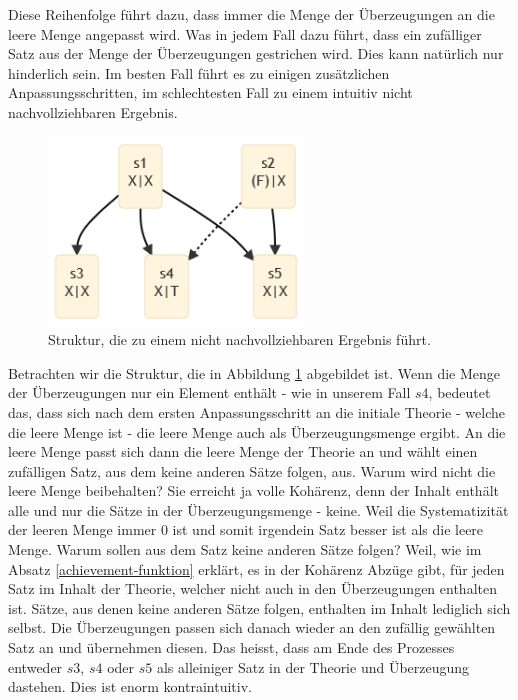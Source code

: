 \documentclass{article}
\begin{document}
Diese Reihenfolge führt dazu, dass immer die Menge der Überzeugungen an die leere Menge angepasst wird. Was in jedem Fall dazu führt, dass ein zufälliger Satz aus der Menge der Überzeugungen gestrichen wird. Dies kann natürlich nur hinderlich sein. Im besten Fall führt es zu einigen zusätzlichen Anpassungsschritten, im schlechtesten Fall zu einem intuitiv nicht nachvollziehbaren Ergebnis.

\begin{figure}[ht]
  \centering
  \includegraphics[width=\textwidth,height=5cm,keepaspectratio]{images/wierd.png}
  \caption{Struktur, die zu einem nicht nachvollziehbaren Ergebnis führt.\label{fig:wierd}}
\end{figure}

Betrachten wir die Struktur, die in Abbildung \ref{fig:wierd} abgebildet ist. Wenn die Menge der Überzeugungen nur ein Element enthält - wie in unserem Fall $s4$, bedeutet das, dass sich nach dem ersten Anpassungsschritt an die initiale Theorie - welche die leere Menge ist - die leere Menge auch als Überzeugungsmenge ergibt. An die leere Menge passt sich dann die leere Menge der Theorie an und wählt einen zufälligen Satz, aus dem keine anderen Sätze folgen, aus. Warum wird nicht die leere Menge beibehalten? Sie erreicht ja volle Kohärenz, denn der Inhalt enthält alle und nur die Sätze in der Überzeugungsmenge - keine. Weil die Systematizität der leeren Menge immer 0 ist und somit irgendein Satz besser ist als die leere Menge. Warum sollen aus dem Satz keine anderen Sätze folgen? Weil, wie im Absatz \ref{achievement-funktion} erklärt, es in der Kohärenz Abzüge gibt, für jeden Satz im Inhalt der Theorie, welcher nicht auch in den Überzeugungen enthalten ist. Sätze, aus denen keine anderen Sätze folgen,  enthalten im Inhalt lediglich sich selbst.
Die Überzeugungen passen sich danach wieder an den zufällig gewählten Satz an und übernehmen diesen. Das heisst, dass am Ende des Prozesses entweder $s3$, $s4$ oder $s5$ als alleiniger Satz in der Theorie und Überzeugung dastehen. Dies ist enorm kontraintuitiv.
\end{document}

